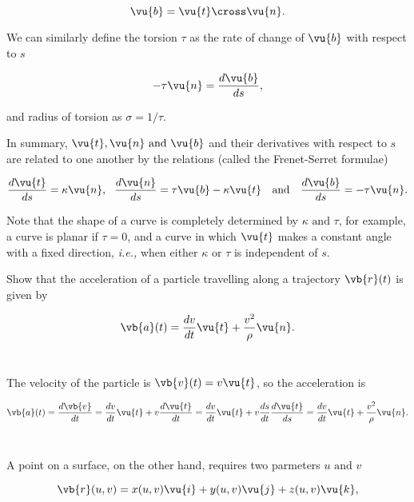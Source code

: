 \documentclass[english,a4paper,12pt]{report}
\begin{document}
\begin{equation}
	\vu{b} = \vu{t} \cross \vu{n} .
\end{equation}

We can similarly define the torsion \(\tau \) as the rate of change of \(\vu{b} \) with respect to \(s\)  

\begin{equation}
	-\tau \vu{n} =  \frac{d \vu{b} }{ds}, 
\end{equation}

and radius of torsion as \(\sigma  = 1/ \tau  \). 

In summary, \(\vu{t} , \vu{n} \text { and } \vu{b} \) and their derivatives with respect to \(s\) are related to one another by the relations (called the Frenet-Serret formulae) 

\begin{equation}
	\frac{d \vu{t} }{ds} = \kappa \vu{n} , ~~\frac{d \vu{n} }{ds} = \tau \vu{b} - \kappa \vu{t}~~ \text { and } ~~\frac{d \vu{b} }{ds} = -\tau \vu{n} .  
\end{equation}

Note that the shape of a curve is completely determined by \(\kappa \text { and } \tau \), for example, a curve is planar if \(\tau = 0\), and a curve in which \(\vu{t} \) makes a constant angle with a fixed direction, \textit{i.e.,} when either \(\kappa \text { or } \tau \) is independent of \(s\).    

{Show that the acceleration of a particle travelling along a trajectory \(\vb{r} (t)\) is given by 

\begin{equation}
	\vb{a} (t) = \frac{dv}{dt} \vu{t} + \frac{v^2}{\rho } \vu{n} .  
\end{equation}
~
}
{The velocity of the particle is \(\vb{v} (t) = v \vu{t} \), so the acceleration is 

\begin{equation}
	\vb{a} (t) = \frac{d\vb{v} }{dt} = \frac{dv}{dt} \vu{t} + v \frac{d \vu{t} }{dt} = \frac{dv}{dt}\vu{t} + v \frac{ds}{dt}\frac{d \vu{t} }{ds} = \frac{dv}{dt} \vu{t} + \frac{v^2}{\rho }\vu{n} .       
\end{equation}
~
}

A point on a surface, on the other hand, requires two parmeters \(u \text { and } v\) 

\begin{equation}
	\vb{r} (u,v)  = x(u,v) \vu{i} + y(u,v) \vu{j} + z(u,v) \vu{k},
\end{equation}
\end{document}
